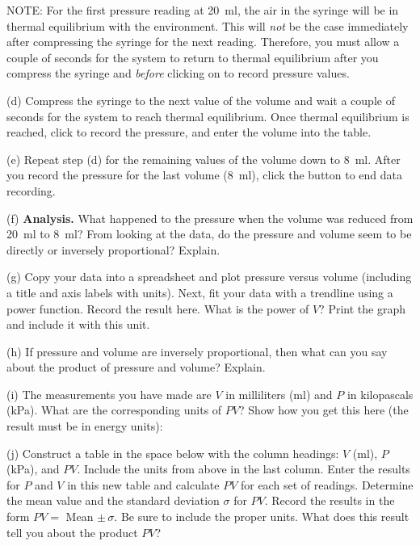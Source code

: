 NOTE: For the first pressure reading at 20~ml, the air in the syringe will be
in thermal equilibrium with the environment. This will \textit{not} be the case immediately
after compressing the syringe for the next reading. Therefore, you must allow
a couple of seconds for the system to return to thermal equilibrium after you 
compress the syringe and \textit{before} clicking on  to record pressure values. 

(d) Compress the syringe to the next value of the volume 
and wait a couple of seconds for the system to reach thermal equilibrium. Once 
thermal equilibrium is reached, click  to record the pressure, and enter the volume into the table.

(e) Repeat step (d) for the remaining values of the volume down to 8~ml.  After you record
the pressure for the last volume (8~ml), click the  button to end data recording.

(f) \textbf{Analysis.} What happened to the pressure when the volume was 
reduced from 20~ml to 8~ml? From looking at the data, do the pressure and 
volume seem to be directly or inversely proportional? Explain.
\vspace{25mm}

(g) Copy your data into a spreadsheet and plot pressure versus volume 
(including a title and axis labels with units). Next, fit your data with a 
trendline using a power function. Record the result here. What is the power of 
$V$? Print the graph and include it with this unit.
\vspace{25mm}

(h) If pressure and volume are inversely proportional, then what can you say
about the product of pressure and volume? Explain.
\vspace{25mm}

\newpage

(i) The measurements you have made are $V$ in milliliters (ml) and $P$ in 
kilopascals (kPa). What are the corresponding units of $PV$? Show how you get 
this here (the result must be in energy units):
\vspace{40mm}

(j) Construct a table in the space below with the column headings: $V$ (ml), $P$
(kPa), and $PV$. Include the units from above in the last column.
Enter the results for $P$ and $V$ in this new table and calculate
$PV$ for each set of readings. Determine the mean value and the standard deviation
$\sigma$ for $PV$. Record the results in the form 
$PV =$ Mean $\pm \, \sigma$. Be sure to include the proper units. 
What does this result tell you about the  product $PV$?

